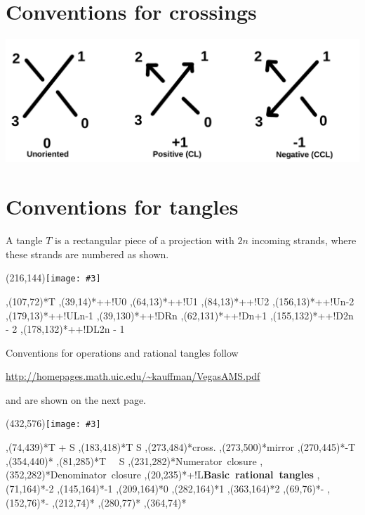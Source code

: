 \documentclass[12pt]{article}
\newenvironment{xyoverpic}[3]
{%
\begin{xy}
\xyimport#1{\texttt{[image: \#3]}}
}{\end{xy}}
\newenvironment{cxyoverpic}[3]
{%
\begin{center}
\centering\leavevmode\large
\begin{xyoverpic}{#1}{#2}{#3}
}{\end{xyoverpic}
\end{center}}
\begin{document}
\section{Conventions for crossings}

\includegraphics[scale=0.6]{pics/crossings}

\section{Conventions for tangles}

A tangle $T$ is a rectangular piece of a projection with $2n$ incoming
strands, where these strands are numbered as shown.

\begin{cxyoverpic}{(216,144)}{scale=1.0}{pics/tangle}
    ,(107,72)*{T}
    ,(39,14)*++!U{0}
    ,(64,13)*++!U{1}
    ,(84,13)*++!U{2}
    ,(156,13)*++!U{n-2}
    ,(179,13)*++!UL{n-1}
    ,(39,130)*++!DR{n}
    ,(62,131)*++!D{n+1}
    ,(155,132)*++!D{2n - 2}
    ,(178,132)*++!DL{2n - 1}
\end{cxyoverpic}


Conventions for operations and rational tangles follow

 \url{http://homepages.math.uic.edu/~kauffman/VegasAMS.pdf}

and are shown on the next page.

\pagebreak

\begin{cxyoverpic}{(432,576)}{scale=1.0}{pics/tangles}
    ,(74,439)*{T + S}
    ,(183,418)*{T \ast S}
    ,(273,484)*{\mbox{\scriptsize cross.}}
    ,(273,500)*{\mbox{\scriptsize mirror}}
    ,(270,445)*{-T}
    ,(354,440)*{\displaystyle{}}
    ,(81,285)*{T \, \big\vert \, S}
    ,(231,282)*{\mbox{\normalsize Numerator closure}}
    ,(352,282)*{\mbox{\normalsize Denominator closure}}
    ,(20,235)*+!L{\mbox{\textbf{Basic rational tangles}}}
    ,(71,164)*{-2}
    ,(145,164)*{-1}
    ,(209,164)*{0}
    ,(282,164)*{1}
    ,(363,164)*{2}
    ,(69,76)*{\displaystyle -}
    ,(152,76)*{\displaystyle-}
    ,(212,74)*{\infty}
    ,(280,77)*{\displaystyle{}}
    ,(364,74)*{\displaystyle{}}
\end{cxyoverpic}
\end{document}
